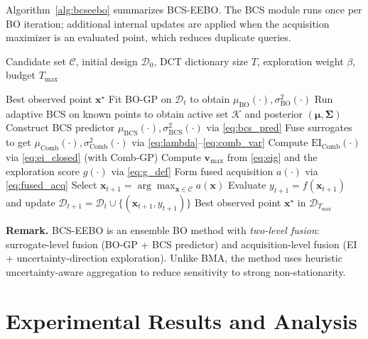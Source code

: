 \documentclass[lettersize,journal]{IEEEtran}
\newcommand{\Input}{\item[\textbf{Input:}]}
\newcommand{\Output}{\item[\textbf{Output:}]}
\begin{document}
Algorithm~\ref{alg:bcseebo} summarizes BCS-EEBO. The BCS module runs once per BO iteration; additional internal updates are applied when the acquisition maximizer is an evaluated point, which reduces duplicate queries.

\begin{algorithm}[t]
\caption{BCS-Enhanced Ensemble Bayesian Optimization }
\label{alg:bcseebo}
\begin{algorithmic}[1]
\Input Candidate set $\mathcal{C}$, initial design $\mathcal{D}_0$, DCT dictionary size $T$, exploration weight $\beta$, budget $T_{\max}$
\Output Best observed point $\mathbf{x}^{\star}$
  \STATE Fit BO-GP on $\mathcal{D}_t$ to obtain $\mu_{\mathrm{BO}}(\cdot),\sigma_{\mathrm{BO}}^2(\cdot)$
  \STATE Run adaptive BCS on known points to obtain active set $\mathcal{K}$ and posterior $(\boldsymbol{\mu},\mathbf{\Sigma})$
  \STATE Construct BCS predictor $\mu_{\mathrm{BCS}}(\cdot),\sigma_{\mathrm{BCS}}^2(\cdot)$ via \eqref{eq:bcs_pred}
  \STATE Fuse surrogates to get $\mu_{\mathrm{Comb}}(\cdot),\sigma_{\mathrm{Comb}}^2(\cdot)$ via \eqref{eq:lambda}--\eqref{eq:comb_var}
  \STATE Compute $\mathrm{EI}_{\mathrm{Comb}}(\cdot)$ via \eqref{eq:ei_closed} (with Comb-GP)
  \STATE Compute $\mathbf{v}_{\max}$ from \eqref{eq:eig} and the exploration score $g(\cdot)$ via \eqref{eq:g_def}
  \STATE Form fused acquisition $a(\cdot)$ via \eqref{eq:fused_acq}
  \STATE Select $\mathbf{x}_{t+1}=\arg\max_{\mathbf{x}\in\mathcal{C}} a(\mathbf{x})$
  \STATE Evaluate $y_{t+1}=f(\mathbf{x}_{t+1})$ and update $\mathcal{D}_{t+1}=\mathcal{D}_t\cup\{(\mathbf{x}_{t+1},y_{t+1})\}$
\ENDFOR
\RETURN Best observed point $\mathbf{x}^{\star}$ in $\mathcal{D}_{T_{\max}}$
\end{algorithmic}
\end{algorithm}

\vspace{0.2em}
\noindent\textbf{Remark.}
BCS-EEBO is an ensemble BO method with \emph{two-level fusion}:
surrogate-level fusion (BO-GP + BCS predictor) and acquisition-level fusion (EI + uncertainty-direction exploration).
Unlike BMA, the method uses heuristic uncertainty-aware aggregation to reduce sensitivity to strong non-stationarity.


\section{Experimental Results and Analysis}
\label{sec:experiments}
\end{document}
